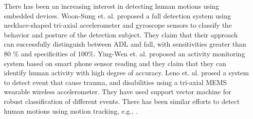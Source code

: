 \documentclass[letterpaper]{article}
\begin{document}
There has been an increasing interest in detecting human motions using embedded devices. Woon-Sung
et. al. \cite{baek2013real} proposed  a fall  detection  system  using necklace-shaped tri-axial
accelerometer  and  gyroscope  sensors  to  classify  the  behavior  and  posture  of  the detection
 subject. They claim that their  approach  can  successfully  distinguish between  ADL and  fall, 
with  sensitivities  greater  than  80 \%  and specificities  of  100\%. Ying-Wen et. al.
\cite{bai2013recognition} proposed an activity monitoring system based on smart phone sensor
reading and they claim that they can identify human activity with high degree of accuracy. Leno et.
al. \cite{leone2013supervised} prosed a system to detect event that cause trauma, and disabilities
using a tri-axial MEMS wearable wireless accelerometer. They have used support vector machine for
robust classification of different events. There has been similar efforts to detect human motions
using motion tracking, e.g., \cite{dumitrache2013fall,kumarwearable,liang2012pre}.
\end{document}
